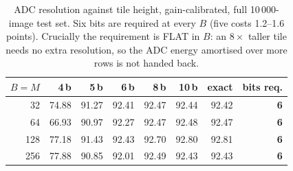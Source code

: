 \begin{table}[t]
\centering
\caption{ADC resolution against tile height, gain-calibrated, full 10\,000-image test set. Six bits are required at every $B$ (five costs 1.2--1.6 points). Crucially the requirement is FLAT in $B$: an $8\times$ taller tile needs no extra resolution, so the ADC energy amortised over more rows is not handed back.}
\label{tab:adc}
\begin{tabular}{rrrrrrrr}
\toprule
$B{=}M$ & 4\,b & 5\,b & 6\,b & 8\,b & 10\,b & exact & bits req. \\
\midrule
32 & 74.88 & 91.27 & 92.41 & 92.47 & 92.44 & 92.42 & \textbf{6} \\
64 & 66.93 & 90.97 & 92.27 & 92.47 & 92.48 & 92.47 & \textbf{6} \\
128 & 77.18 & 91.43 & 92.43 & 92.70 & 92.80 & 92.81 & \textbf{6} \\
256 & 77.88 & 90.85 & 92.01 & 92.49 & 92.43 & 92.43 & \textbf{6} \\
\bottomrule
\end{tabular}
\end{table}
